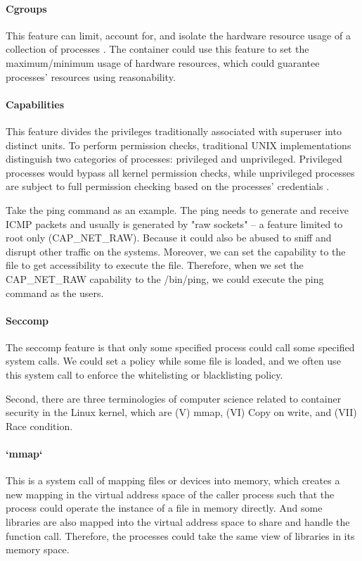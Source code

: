 \documentclass[12pt,a4paper]{article}
\begin{document}
\paragraph{Cgroups}
This feature can limit, account for, and isolate the hardware resource usage of a
collection of processes \cite{cgroup_wiki}.
The container could use this feature to set the maximum/minimum usage of hardware
resources, which could guarantee processes' resources using reasonability.

\paragraph{Capabilities}
This feature divides the privileges traditionally associated with superuser into
distinct units. To perform permission checks, traditional UNIX
implementations distinguish two categories of processes: privileged and unprivileged.
Privileged processes would bypass all kernel permission checks, while unprivileged
processes are subject to full permission checking based on the processes' credentials
\cite{capabilities}.

Take the ping command as an example. The ping needs to generate and receive ICMP packets
and usually is generated by "raw sockets" – a feature limited to root only
(CAP\_NET\_RAW). Because it could also be abused to sniff and disrupt other traffic
on the systems. Moreover, we can set the capability to the file to get accessibility
to execute the file.
Therefore, when we set the CAP\_NET\_RAW capability to the /bin/ping, we could execute
the ping command as the users.

\paragraph{Seccomp}
The seccomp feature is that only some specified process could call some specified
system calls. We could set a policy while some file is loaded, and we often use
this system call to enforce the whitelisting or blacklisting policy.

Second, there are three terminologies of computer science related to container
security in the Linux kernel, which are (\RN{5}) mmap, (\RN{6}) Copy on write,
and (\RN{7}) Race condition.

\paragraph{`mmap`}
This is a system call of mapping files or devices into memory, which creates a
new mapping in the virtual address space of the caller process such that
the process could operate the instance of a file in memory directly.
And some libraries are also mapped into the virtual address space to share and handle
the function call. Therefore, the processes could take the same view of libraries in
its memory space.
\end{document}
